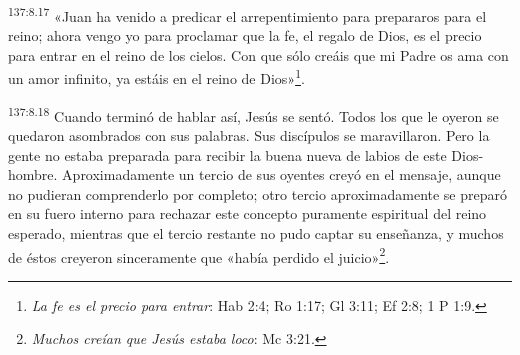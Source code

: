 \par 
\textsuperscript{137:8.17} «Juan ha venido a predicar el arrepentimiento para prepararos para el reino; ahora vengo yo para proclamar que la fe, el regalo de Dios, es el precio para entrar en el reino de los cielos. Con que sólo creáis que mi Padre os ama con un amor infinito, ya estáis en el reino de Dios»\footnote{\textit{La fe es el precio para entrar}: Hab 2:4; Ro 1:17; Gl 3:11; Ef 2:8; 1 P 1:9.}.

\par 
\textsuperscript{137:8.18} Cuando terminó de hablar así, Jesús se sentó. Todos los que le oyeron se quedaron asombrados con sus palabras. Sus discípulos se maravillaron. Pero la gente no estaba preparada para recibir la buena nueva de labios de este Dios-hombre. Aproximadamente un tercio de sus oyentes creyó en el mensaje, aunque no pudieran comprenderlo por completo; otro tercio aproximadamente se preparó en su fuero interno para rechazar este concepto puramente espiritual del reino esperado, mientras que el tercio restante no pudo captar su enseñanza, y muchos de éstos creyeron sinceramente que «había perdido el juicio»\footnote{\textit{Muchos creían que Jesús estaba loco}: Mc 3:21.}.